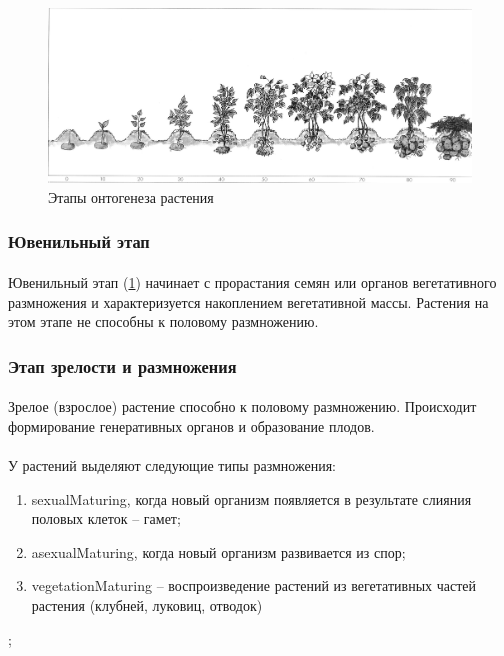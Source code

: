 \begin{figure}[h!]
  \centering
       \includegraphics[width=0.7\linewidth]{pictures/ontogenesis_stages}
\caption{Этапы онтогенеза растения}
\label{ontogenesis_stages}
\end{figure}

\subsubsection*{Ювенильный этап} 

\paragraph*{}Ювенильный этап (\ris \ref{ontogenesis_stages}) начинает с прорастания семян или органов вегетативного размножения и характеризуется накоплением вегетативной массы. Растения на этом этапе не способны к половому размножению.

\subsubsection*{Этап зрелости и размножения}

\paragraph*{}Зрелое (взрослое) растение способно к половому размножению. Происходит формирование генеративных органов и образование плодов. 
\paragraph*{}У растений выделяют следующие типы размножения:

\begin{enumerate}
	\item \gls{sexualMaturing}, когда новый организм появляется в результате слияния половых клеток -- гамет;
	\item \gls{asexualMaturing}, когда новый организм развивается из спор;
	\item \gls{vegetationMaturing} -- воспроизведение растений из вегетативных частей растения (клубней, луковиц, отводок)
\end{enumerate};

